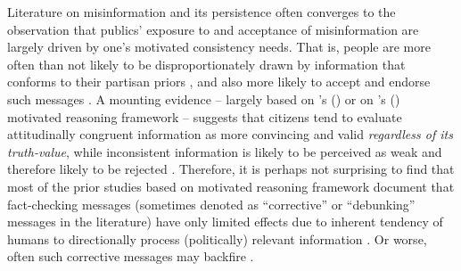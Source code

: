 \documentclass[man, 12pt, a4paper]{apa6}
\begin{document}
      Literature on misinformation and its persistence often converges to the observation that publics' exposure to and acceptance of misinformation are largely driven by one's motivated consistency needs. That is, people are more often than not likely to be disproportionately drawn by information that conforms to their partisan priors \parencite{guess2018selective, weeks2014electoral}, and also more likely to accept and endorse such messages \parencite{kunda1990,nyhan2010corrections}. A mounting evidence -- largely based on \citeauthor{kunda1990}'s (\citeyear{kunda1990}) or on \citeauthor{taber2006}'s (\citeyear{taber2006}) motivated reasoning framework -- suggests that citizens tend to evaluate attitudinally congruent information as more convincing and valid \emph{regardless of its truth-value}, while inconsistent information is likely to be perceived as weak and therefore likely to be rejected \parencite{taber2006,weeks2015emotions}. Therefore, it is perhaps not surprising to find that most of the prior studies based on motivated reasoning framework document that fact-checking messages (sometimes denoted as \enquote{corrective} or \enquote{debunking} messages in the literature) have only limited effects due to inherent tendency of humans to directionally process (politically) relevant information \parencite{thorson_2016, taber2006,flynn2017nature}. Or worse, often such corrective messages may backfire \parencite[i.e., more likely to increase than lower the endorsement of false beliefs:][]{nyhan2010corrections}.
      
\end{document}
